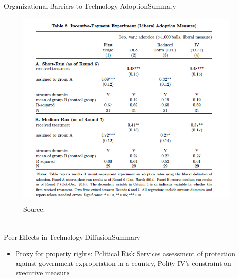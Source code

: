\documentclass{beamer}
\begin{document}
\begin{frame}{Organizational Barriers to Technology Adoption}{Summary}
\begin{figure}[h]
\begin{centering}
  \includegraphics[width=\textwidth]{atkin7}
  \caption{Source: \cite{Atkin2015}}
   \label{fig:atkin7}
\end{centering}
\end{figure}
\end{frame}




\section{\cite{Bollinger2012}}
\begin{frame}{Peer Effects in Technology Diffusion}{Summary}
\begin{itemize}
\item{Proxy for property rights: Political Risk Services assessment of protection against government expropriation in a country, Polity IV's constraint on executive measure}
\end{itemize}
\end{frame}




\end{document}
